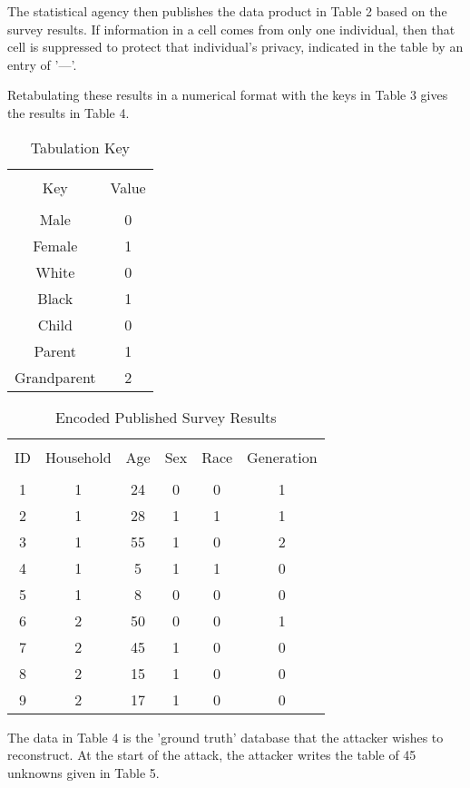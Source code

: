 \documentclass[jou,apacite]{apa6}
\begin{document}
The statistical agency then publishes the data product in Table 2 based on the survey results. If information in a cell comes from only one individual, then that cell is suppressed to protect that individual's privacy, indicated in the table by an entry of '---'.

Retabulating these results in a numerical format with the keys in Table 3 gives the results in Table 4.

\begin{table}[t]
\caption{Tabulation Key}\label{tab3}
\begin{tabular}{c|c}
\hline\\[-1.5ex]
Key & Value \\[0.5ex]
\hline\\[-1.5ex]
Male & 0 \\[0.5ex]
Female & 1 \\[0.5ex]
White & 0 \\[0.5ex]
Black & 1 \\[0.5ex]
Child & 0 \\[0.5ex]
Parent & 1 \\[0.5ex]
Grandparent & 2 \\[0.5ex]
\hline
\end{tabular}
\end{table}

\begin{table}[t]
\caption{Encoded Published Survey Results}\label{tab4}
\begin{tabular}{c|c|c|c|c|c}
\hline\\[-1.5ex]
ID & Household & Age & Sex & Race & Generation \\[0.5ex]
\hline\\[-1.5ex]
1 & 1 & 24 & 0 & 0 & 1  \\[0.5ex]
2 & 1 & 28 & 1 & 1 & 1  \\[0.5ex]
3 & 1 & 55 & 1 & 0 & 2  \\[0.5ex]
4 & 1 & 5 & 1 & 1 & 0  \\[0.5ex]
5 & 1 & 8 & 0 & 0 & 0  \\[0.5ex]
6 & 2 & 50 & 0 & 0 & 1  \\[0.5ex]
7 & 2 & 45 & 1 & 0 & 0  \\[0.5ex]
8 & 2 & 15 & 1 & 0 & 0  \\[0.5ex]
9 & 2 & 17 & 1 & 0 & 0 \\[0.5ex]
\hline
\end{tabular}
\end{table}


The data in Table 4 is the 'ground truth' database that the attacker wishes to reconstruct. At the start of the attack, the attacker writes the table of 45 unknowns given in Table 5.
\end{document}

